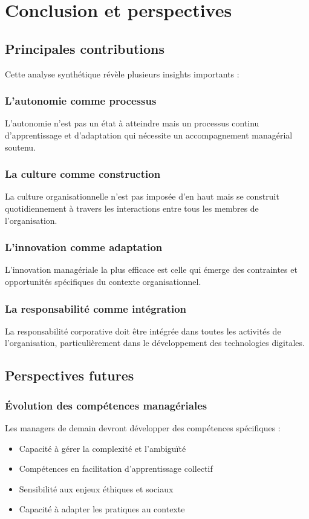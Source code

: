 \documentclass[12pt,a4paper]{article}
\begin{document}
\section{Conclusion et perspectives}

\subsection{Principales contributions}

Cette analyse synthétique révèle plusieurs insights importants :

\subsubsection{L'autonomie comme processus}
L'autonomie n'est pas un état à atteindre mais un processus continu d'apprentissage et d'adaptation qui nécessite un accompagnement managérial soutenu.

\subsubsection{La culture comme construction}
La culture organisationnelle n'est pas imposée d'en haut mais se construit quotidiennement à travers les interactions entre tous les membres de l'organisation.

\subsubsection{L'innovation comme adaptation}
L'innovation managériale la plus efficace est celle qui émerge des contraintes et opportunités spécifiques du contexte organisationnel.

\subsubsection{La responsabilité comme intégration}
La responsabilité corporative doit être intégrée dans toutes les activités de l'organisation, particulièrement dans le développement des technologies digitales.

\subsection{Perspectives futures}

\subsubsection{Évolution des compétences managériales}
Les managers de demain devront développer des compétences spécifiques :
\begin{itemize}
    \item Capacité à gérer la complexité et l'ambiguïté
    \item Compétences en facilitation d'apprentissage collectif
    \item Sensibilité aux enjeux éthiques et sociaux
    \item Capacité à adapter les pratiques au contexte
\end{itemize}
\end{document}
